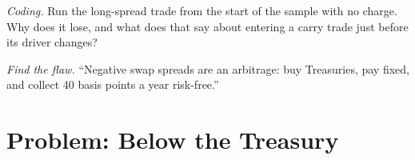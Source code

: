\begin{exercise}[$\star\star\star$]\label{exo:s2:swap-spread-and-asset-swap-trades:7}
\emph{Coding.} Run the long-spread trade from the start of the sample with no charge. Why does it lose, and what does that say about entering a
carry trade just before its driver changes?
\end{exercise}

\begin{exercise}[$\star\star\star$]\label{exo:s2:swap-spread-and-asset-swap-trades:8}
\emph{Find the flaw.} ``Negative swap spreads are an arbitrage: buy Treasuries, pay fixed, and collect 40 basis points a year risk-free.''
\end{exercise}

\section{Problem: Below the Treasury}

